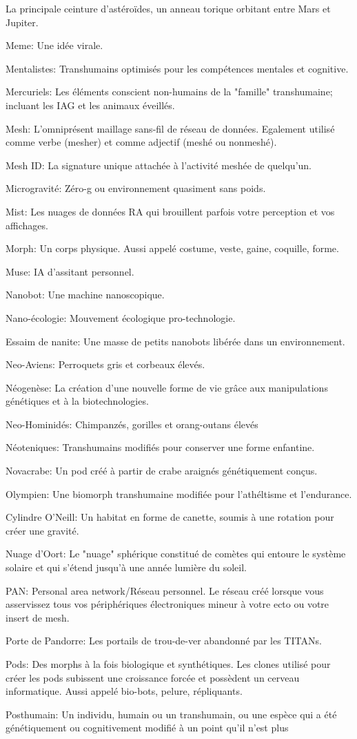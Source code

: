 La principale ceinture d'astéroïdes, un anneau torique orbitant entre Mars et Jupiter. \item Meme: Une idée virale. \item Mentalistes: Transhumains optimisés pour les compétences mentales et cognitive. \item Mercuriels: Les éléments conscient non-humains de la "famille" transhumaine; incluant les IAG et les animaux éveillés. \item Mesh: L'omniprésent maillage sans-fil de réseau de données. Egalement utilisé comme verbe (mesher) et comme adjectif (meshé ou nonmeshé). \item Mesh ID: La signature unique attachée à l'activité meshée de quelqu'un. \item Microgravité: Zéro-g ou environnement quasiment sans poids. \item Mist: Les nuages de données RA qui brouillent parfois votre perception et vos affichages. \item Morph: Un corps physique. Aussi appelé costume, veste, gaine, coquille, forme. \item Muse: IA d'assitant personnel. \item Nanobot: Une machine nanoscopique. \item Nano-écologie: Mouvement écologique pro-technologie. \item Essaim de nanite: Une masse de petits nanobots libérée dans un environnement. \item Neo-Aviens: Perroquets gris et corbeaux élevés. \item Néogenèse: La création d'une nouvelle forme de vie grâce aux manipulations génétiques et à la biotechnologies. \item Neo-Hominidés: Chimpanzés, gorilles et orang-outans élevés \item Néoteniques: Transhumains modifiés pour conserver une forme enfantine. \item Novacrabe: Un pod créé à partir de crabe araignés génétiquement conçus. \item Olympien: Une biomorph transhumaine modifiée pour l'athéltisme et l'endurance. \item Cylindre O'Neill: Un habitat en forme de canette, soumis à une rotation pour créer une gravité. \item Nuage d'Oort: Le "nuage" sphérique constitué de comètes qui entoure le système solaire et qui s'étend jusqu'à une année lumière du soleil. \item PAN: Personal area network/Réseau personnel. Le réseau créé lorsque vous asservissez tous vos périphériques électroniques mineur à votre ecto ou votre insert de mesh. \item Porte de Pandorre: Les portails de trou-de-ver abandonné par les TITANs. \item Pods: Des morphs à la fois biologique et synthétiques. Les clones utilisé pour créer les pods subissent une croissance forcée et possèdent un cerveau informatique. Aussi appelé bio-bots, pelure, répliquants. \item Posthumain: Un individu, humain ou un transhumain, ou une espèce qui a été génétiquement ou cognitivement modifié à un point qu'il n'est plus 